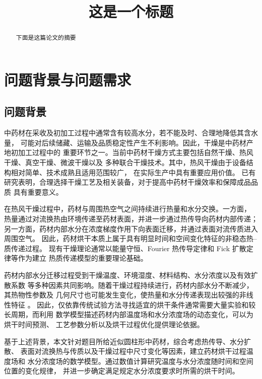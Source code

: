 \documentclass{ctexart}
\title{这是一个标题}
\begin{document}
\maketitle
\begin{abstract}
    下面是这篇论文的摘要
\end{abstract}
\section{问题背景与问题需求}

\subsection{问题背景}

中药材在采收及初加工过程中通常含有较高水分，若不能及时、合理地降低其含水量，
可能对后续储藏、运输及品质稳定性产生不利影响。因此，干燥是中药材产地初加工过程中的
重要环节之一。当前中药材干燥方式主要包括自然干燥、热风干燥、真空干燥、微波干燥以及
多种联合干燥技术。其中，热风干燥由于设备结构相对简单、技术成熟且适用范围较广，
在实际生产中具有重要应用价值\cite{wang2024drying,nurhaslina2022review}。
已有研究表明，合理选择干燥工艺及相关装备，对于提高中药材干燥效率和保障成品品质
具有重要意义\cite{wang2024drying}。

在热风干燥过程中，药材与周围热空气之间持续进行热量和水分交换。一方面，
热量通过对流换热由环境传递至药材表面，并进一步通过热传导向药材内部传递；
另一方面，药材内部水分在浓度梯度作用下向表面迁移，并通过表面对流传质进入周围空气。
因此，药材烘干本质上属于具有明显时间和空间变化特征的非稳态热--质传递过程。
现有干燥理论通常以能量守恒、Fourier 热传导定律和 Fick 扩散定律等作为建立
热质传递模型的重要理论基础\cite{yan2026heat,srikiatden2007moisture}。

药材内部水分迁移过程受到干燥温度、环境湿度、材料结构、水分浓度以及有效扩散系数
等多种因素共同影响。随着干燥过程持续进行，药材内部水分不断减少，其热物性参数及
几何尺寸也可能发生变化，使热量和水分传递表现出较强的非线性特征
\cite{yan2026heat,srikiatden2007moisture}。
因此，仅依靠传统试验方法寻找适宜的烘干条件通常需要大量实验和较长周期，而利用
数学模型描述药材内部温度场和水分浓度场的动态变化，可以为烘干时间预测、
工艺参数分析以及烘干过程优化提供理论依据。

基于上述背景，本文针对题目所给近似圆柱形中药材，综合考虑热传导、水分扩散、
表面对流换热与传质以及干燥过程中尺寸变化等因素，建立药材烘干过程温度场和
水分浓度场的数学模型。通过数值计算研究温度与水分浓度随时间和空间位置的变化规律，
并进一步确定满足规定水分浓度要求时所需的烘干时间。
\end{document}
